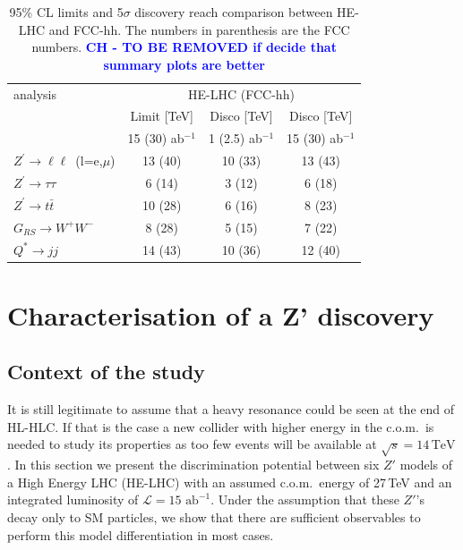 \documentclass[a4paper,11pt]{article}
\newcommand{\CH}[1] {\textbf{\textcolor{blue}{CH - #1}}}
\newcommand*{\Zptata}{\ensuremath{Z^{\prime}\rightarrow \tau\tau}}
\newcommand*{\Zpmumu}{\ensuremath{Z^{\prime}\rightarrow \mu\mu}}
\newcommand*{\Zpll}{\ensuremath{Z^{\prime}\rightarrow \ell\ell}}
\newcommand*{\Zptt}{\ensuremath{Z^{\prime} \rightarrow \ttbar}}
\newcommand*{\intlumihelhc}{\ensuremath{\mathcal{L}=15\,\text{ab}^{-1}}}
\newcommand*{\qjj}{\ensuremath{Q^{*} \rightarrow jj}}
\newcommand*{\rsg}{\ensuremath{G_{RS} \rightarrow W^+W^-}}
\newcommand*{\ttbar}{\ensuremath{t\bar{t}}}
\newcommand*{\com}{c.o.m.~}
\newcommand*{\sqrtslhc}{\ensuremath{\sqrt{s}=14\,\text{TeV}}}
\renewcommand*{\intlumihelhc}{\ensuremath{\mathcal{L}=15\text{ ab}^{-1}}}
\begin{document}
\begin{table}[!htb]\centering
\begin{tabular}{|l|c|c|c|}
\hline
analysis   & \multicolumn{3}{c|}{HE-LHC (FCC-hh)} \\
           & Limit [TeV] & Disco [TeV]   & Disco [TeV] \\
           &  15 (30) ab$^{-1}$ & 1 (2.5) ab$^{-1}$ & 15 (30) ab$^{-1}$ \\
\hline
\Zpll\ (l=e,$\mu$) & 13 (40) & 10 (33) & 13 (43) \\
\Zptata       &  6 (14) &  3 (12) &  6 (18) \\
\Zptt         & 10 (28) &  6 (16) &  8 (23) \\
\rsg          &  8 (28) &  5 (15) &  7 (22) \\
\qjj          & 14 (43) & 10 (36) & 12 (40) \\
\hline
\end{tabular}
\caption{95\% CL limits and 5$\sigma$ discovery reach comparison between HE-LHC and FCC-hh. The numbers in parenthesis are the FCC numbers. \CH{TO BE REMOVED if decide that summary plots are better}}
\label{tab:27vs100}
\end{table}




\section{Characterisation of a Z' discovery}
\label{sec:zprimedisc}

\subsection{Context of the study}
It is still legitimate to assume that a heavy resonance could be seen at the end of HL-HLC. If that is the case a new collider with higher energy
in the \com is needed to study its properties as too few events will be available at \sqrtslhc. In this section we present the discrimination potential between six $Z'$ models of a High Energy LHC (HE-LHC) with an assumed \com energy of 27\,TeV and an integrated luminosity of \intlumihelhc. Under the assumption that these $Z'$'s decay only to SM particles, we show that there are sufficient observables to perform this model differentiation in most cases.
\end{document}
